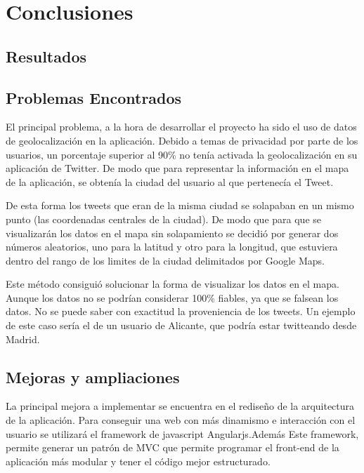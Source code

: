 \chapter{Conclusiones}

\section{Resultados}

\section{Problemas Encontrados}

El principal problema, a la hora de desarrollar el proyecto ha sido el uso de datos de geolocalización en la aplicación. Debido a temas de privacidad por parte de los usuarios, un porcentaje superior al 90\% no tenía activada la geolocalización en su aplicación de Twitter. De modo que para representar la información en el mapa de la aplicación, se obtenía la ciudad del usuario al que pertenecía el Tweet.

\vspace{5 mm}

De esta forma los tweets que eran de la misma ciudad se solapaban en un mismo punto (las coordenadas centrales de la ciudad). De modo que para que se visualizarán los datos en el mapa sin solapamiento se decidió por generar dos números aleatorios, uno para la latitud y otro para la longitud, que estuviera dentro del rango de los limites de la ciudad delimitados por Google Maps.

\vspace{5 mm}

Este método consiguió solucionar la forma de visualizar los datos en el mapa. Aunque los datos no se podrían considerar 100\% fiables, ya que se falsean los datos. No se puede saber con exactitud la proveniencia de los tweets. Un ejemplo de este caso sería el de un usuario de Alicante, que podría estar twitteando desde Madrid.


\section{Mejoras y ampliaciones}

La principal mejora a implementar se encuentra en el rediseño de la arquitectura de la aplicación. Para conseguir una web con más dinamismo e interacción con el usuario se utilizará el framework de javascript Angularjs.Además Este framework, permite generar un patrón de MVC que permite programar el front-end de la aplicación más modular y tener el código mejor estructurado.

